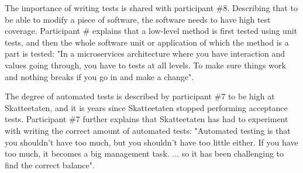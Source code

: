 The importance of writing tests is shared with participant \#8. Describing that to be able to modify a piece of software, the software needs to have high test coverage. Participant \# explains that a low-level method is first tested using unit tests, and then the whole software unit or application of which the method is a part is tested: "In a \gls{microservices} architecture where you have interaction and values going through, you have to tests at all levels. To make sure things work and nothing breaks if you go in and make a change".



The degree of automated tests is described by participant \#7 to be high at Skatteetaten, and it is years since Skatteetaten stopped performing acceptance tests. Participant \#7 further explains that Skatteetaten has had to experiment with writing the correct amount of automated tests: "Automated testing is that you shouldn't have too much, but you shouldn't have too little either. If you have too much, it becomes a big management task. ... so it has been challenging to find the correct balance".


